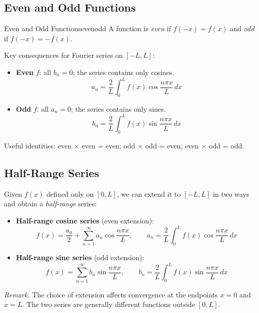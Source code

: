 \documentclass[11pt, letterpaper]{article}
\theoremstyle{plain}
\newenvironment{remark}{\smallskip\noindent\textit{Remark.}}{\smallskip}
\begin{document}
\subsection{Even and Odd Functions}

\begin{definition}{Even and Odd Functions}{evenodd}
    A function is \emph{even} if $f(-x) = f(x)$ and \emph{odd} if
    $f(-x) = -f(x)$.
\end{definition}
 
Key consequences for Fourier series on $[-L, L]$:
 
\begin{itemize}
    \item \textbf{Even} $f$: all $b_n = 0$; the series contains only cosines.
          \[
              a_n = \frac{2}{L}\int_0^L f(x)\cos\frac{n\pi x}{L}\,dx
          \]
    \item \textbf{Odd} $f$: all $a_n = 0$; the series contains only sines.
          \[
              b_n = \frac{2}{L}\int_0^L f(x)\sin\frac{n\pi x}{L}\,dx
          \]
\end{itemize}
 
Useful identities: even $\times$ even = even; odd $\times$ odd = even;
even $\times$ odd = odd.

\subsection{Half-Range Series}
Given $f(x)$ defined only on $[0, L]$, we can extend it to $[-L, L]$ in
two ways and obtain a \emph{half-range} series:
 
\begin{itemize}
    \item \textbf{Half-range cosine series} (even extension):
          \[
              f(x) = \frac{a_0}{2} + \sum_{n=1}^{\infty}
              a_n\cos\frac{n\pi x}{L}, \qquad
              a_n = \frac{2}{L}\int_0^L f(x)\cos\frac{n\pi x}{L}\,dx
          \]
    \item \textbf{Half-range sine series} (odd extension):
          \[
              f(x) = \sum_{n=1}^{\infty}
              b_n\sin\frac{n\pi x}{L}, \qquad
              b_n = \frac{2}{L}\int_0^L f(x)\sin\frac{n\pi x}{L}\,dx
          \]
\end{itemize}
 
\begin{remark}
    The choice of extension affects convergence at the endpoints $x = 0$
    and $x = L$. The two series are generally different functions outside
    $[0, L]$.
\end{remark}
 
\end{document}
